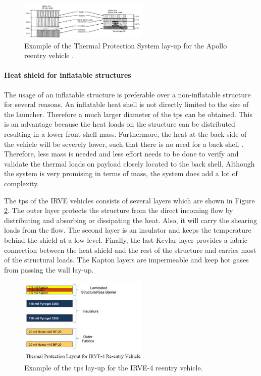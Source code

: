 \begin{figure}[H]
\centering
\includegraphics[width = 0.55\textwidth]{Figure/tpsApollo.png}
\caption[Example of the Thermal Protection System lay-up for the Apollo reentry vehicle]{Example of the Thermal Protection System lay-up for the Apollo reentry vehicle \cite[p.5]{Pavlosky1974}.}
\label{fig:tpslayupapollo}
\end{figure}

\paragraph{Heat shield for inflatable structures}

The usage of  an inflatable structure is preferable over a non-inflatable structure for several reasons. An inflatable heat shell is not directly limited to the size of the launcher. Therefore a much larger diameter of the \gls{tps} can be obtained. This is an advantage because the heat loads on the structure can be distributed resulting in a lower front shell mass. Furthermore, the heat at the back side of the vehicle will be severely lower, such that there is no need for a back shell \cite{Hughes2005}. Therefore, less mass is needed and less effort needs to be done to verify and validate the thermal loads on payload closely located to the back shell. Although the system is very promising in terms of mass, the system does add a lot of complexity. 

The \gls{tps} of the IRVE vehicles consists of several layers \cite{Litton2011} which are shown in Figure \ref{fig:tpslayup}. The outer layer protects the structure from the direct incoming flow by distributing and absorbing or dissipating the heat. Also, it will carry the shearing loads from the flow. The second layer is an insulator and keeps the temperature behind the shield at a low level. Finally, the last Kevlar layer provides a fabric connection between the heat shield and the rest of the structure and carries most of the structural loads. The Kapton layers are impermeable and keep hot gases from passing the wall lay-up.

\begin{figure}[H]
\centering
\includegraphics[width = 0.55\textwidth]{Figure/IRVE4TPS.jpg}
\caption[Example of the \gls{tps} lay-up for the IRVE-4 reentry vehicle]{Example of the \gls{tps} lay-up for the IRVE-4 reentry vehicle\cite[p.6]{Litton2011}.}
\label{fig:tpslayup}
\end{figure}

